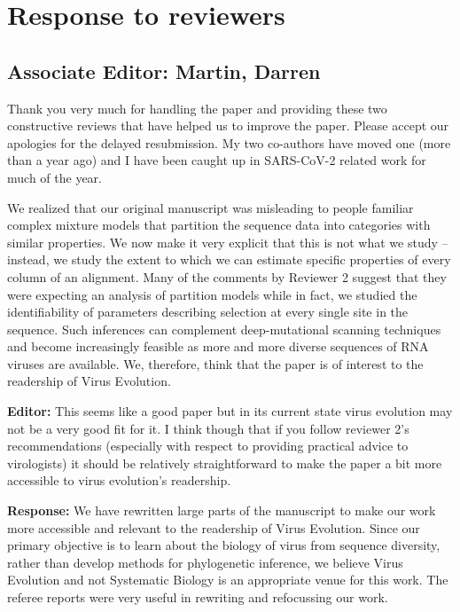 \documentclass[aps,rmp,onecolumn]{revtex4-1}
\newcommand{\editor}[1]{\textbf{Editor:} #1}
\newcommand{\response}[1]{{\color{black}\textbf{Response:} #1}}
\begin{document}
\section*{Response to reviewers}

\subsection*{Associate Editor: Martin, Darren}

Thank you very much for handling the paper and providing these two constructive reviews that have helped us to improve the paper. Please accept our apologies for the delayed resubmission. My two co-authors have moved one (more than a year ago) and I have been caught up in SARS-CoV-2 related work for much of the year.

We realized that our original manuscript was misleading to people familiar complex mixture models that partition the sequence data into categories with similar properties. We now make it very explicit that this is not what we study -- instead, we study the extent to which we can estimate specific properties of every column of an alignment. Many of the comments by Reviewer 2 suggest that they were expecting an analysis of partition models while in fact, we studied the identifiability of parameters describing selection at every single site in the sequence. Such inferences can complement deep-mutational scanning techniques and become increasingly feasible as more and more diverse sequences of RNA viruses are available. We, therefore, think that the paper is of interest to the readership of Virus Evolution.


\editor{This seems like a good paper but in its current state virus evolution may not be a very good fit for it.  I think though that if you follow reviewer 2's recommendations (especially with respect to providing practical advice to virologists) it should be relatively straightforward to make the paper a bit more accessible to virus evolution's readership.}

\response{
We have rewritten large parts of the manuscript to make our work more accessible and relevant to the readership of Virus Evolution.
Since our primary objective is to learn about the biology of virus from sequence diversity, rather than develop methods for phylogenetic inference, we believe Virus Evolution and not Systematic Biology is an appropriate venue for this work.
The referee reports were very useful in rewriting and refocussing our work.
}
\end{document}
